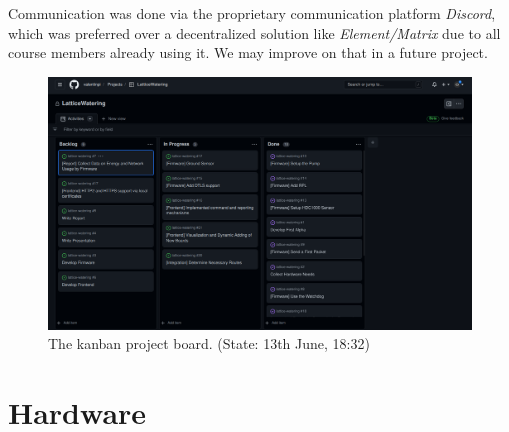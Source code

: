 \documentclass[acmtog, language=english, nonacm]{acmart}
\begin{document}
    Communication was done via the proprietary communication platform \emph{Discord}, which was preferred over a decentralized solution like \emph{Element/Matrix} due to all course members already using it. We may improve on that in a future project.

    \begin{figure}[!hbtp]
        \centering
        \includegraphics[width=\linewidth]{img/kanban_board.png}
        \caption{The kanban project board. (State: 13th June, 18:32)}
        \label{fig:kanban_board}
    \end{figure}

    \label{sec:hardware} \section{Hardware}
\end{document}
